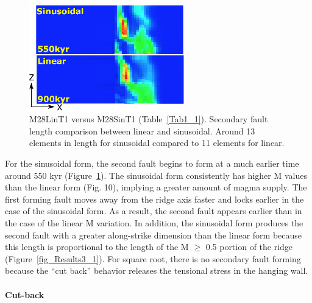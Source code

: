 \begin{figure}[h]
  \centering
    \includegraphics[width=0.6\textwidth]{./Figures/fig_Results4_2_secondary_fault_length_comparison.eps}
  \caption{M28LinT1 versus M28SinT1 (Table~\hyperref[Tab1_1]{\ref{Tab1_1}}). Secondary fault length comparison between linear and sinusoidal. Around 13 elements in length for sinusoidal compared to 11 elements for linear.}
 \label{fig_Results4_2}
\end{figure}   

For the sinusoidal form, the second fault begins to form at a much earlier time around 550 kyr (Figure~\hyperref[fig_Results4_2]{\ref{fig_Results4_2}}). The sinusoidal form consistently has higher M values than the linear form (Fig. 10), implying a greater amount of magma supply. %
The first forming fault moves away from the ridge axis faster and locks earlier in the case of the sinusoidal form. As a result, the second fault appears earlier than in the case of the linear M variation. In addition, the sinusoidal form produces the second fault with a greater along-strike dimension than the linear form because this length is proportional to the length of the M $\ge$ 0.5 portion of the ridge (Figure~\hyperref[fig_Results3_1]{\ref{fig_Results3_1}}). 
For square root, there is no secondary fault forming because the ``cut back'' behavior releases the tensional stress in the hanging wall.

\paragraph{Cut-back}\label{para_CutBack}

